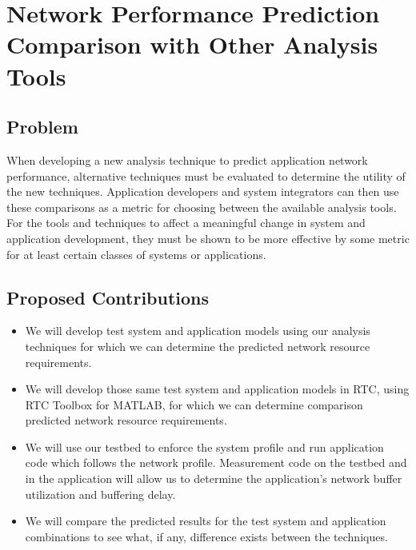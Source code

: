\newpage

\section{Network Performance Prediction Comparison with Other Analysis Tools}
\label{sec:comparison}

\subsection{Problem}
When developing a new analysis technique to predict application network performance, alternative techniques must be evaluated to determine the utility of the new techniques.  Application developers and system integrators can then use these comparisons as a metric for choosing between the available analysis tools.  For the tools and techniques to affect a meaningful change in system and application development, they must be shown to be more effective by some metric for at least certain classes of systems or applications.  

\subsection{Proposed Contributions}
\begin{itemize}
	\item We will develop test system and application models using our analysis techniques for which we can determine the predicted network resource requirements.
	\item We will develop those same test system and application models in RTC, using RTC Toolbox for MATLAB, for which we can determine comparison predicted network resource requirements.
	\item We will use our testbed to enforce the system profile and run application code which follows the network profile.  Measurement code on the testbed and in the application will allow us to determine the application's network buffer utilization and buffering delay.
	\item We will compare the predicted results for the test system and application combinations to see what, if any, difference exists between the techniques.
\end{itemize}


